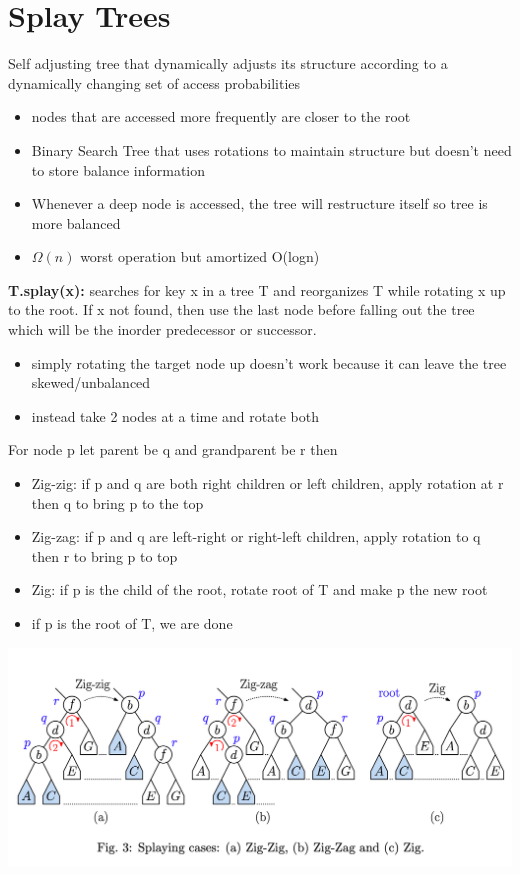\documentclass{article}
\begin{document}
  \section{Splay Trees}
  Self adjusting tree that dynamically adjusts its structure according to a dynamically changing set of access probabilities
  \begin{itemize}[noitemsep]
  \item nodes that are accessed more frequently are closer to the root
  \item Binary Search Tree that uses rotations to maintain structure but doesn't need to store balance information
  \item Whenever a deep node is accessed, the tree will restructure itself so tree is more balanced 
  \item $\Omega(n)$ worst operation but amortized O(logn) \\
  \end{itemize}
  \textbf{T.splay(x): }searches for key x in a tree T and reorganizes T while rotating x up to the root. If x not found, then use the last node before falling out the tree which will be the inorder predecessor or successor.
  \begin{itemize}[noitemsep]
  \item simply rotating the target node up doesn't work because it can leave the tree skewed/unbalanced
  \item instead take 2 nodes at a time and rotate both
  \end{itemize}
  For node p let parent be q and grandparent be r then
  \begin{itemize}[noitemsep]
  \item Zig-zig: if p and q are both right children or left children, apply rotation at r then q to bring p to the top
  \item Zig-zag: if p and q are left-right or right-left children, apply rotation to q then r to bring p to top 
  \item Zig: if p is the child of the root, rotate root of T and make p the new root
  \item if p is the root of T, we are done
  \end{itemize}
  \begin{center}
  \includegraphics[scale=0.20]{SplayTreeZig}
  \end{center}
\end{document}
